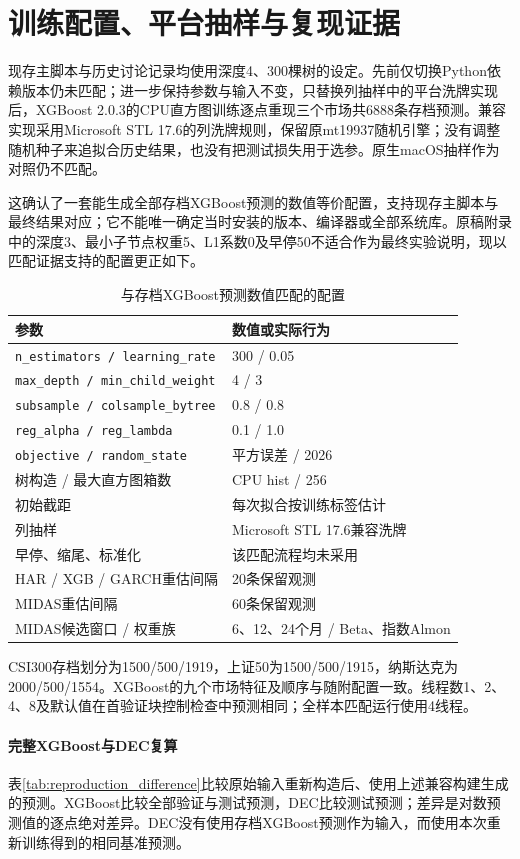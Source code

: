 \appendix
\section{训练配置、平台抽样与复现证据}
现存主脚本与历史讨论记录均使用深度4、300棵树的设定。先前仅切换Python依赖版本仍未匹配；进一步保持参数与输入不变，只替换列抽样中的平台洗牌实现后，XGBoost 2.0.3的CPU直方图训练逐点重现三个市场共6888条存档预测。兼容实现采用Microsoft STL 17.6的列洗牌规则，保留原mt19937随机引擎；没有调整随机种子来追拟合历史结果，也没有把测试损失用于选参。原生macOS抽样作为对照仍不匹配。

这确认了一套能生成全部存档XGBoost预测的数值等价配置，支持现存主脚本与最终结果对应；它不能唯一确定当时安装的版本、编译器或全部系统库。原稿附录中的深度3、最小子节点权重5、L1系数0及早停50不适合作为最终实验说明，现以匹配证据支持的配置更正如下。

\begin{table}[htbp]\centering\caption{与存档XGBoost预测数值匹配的配置}
\begin{tabular}{ll}\toprule 参数 & 数值或实际行为\\\midrule
\texttt{n\_estimators / learning\_rate} & 300 / 0.05\\
\texttt{max\_depth / min\_child\_weight} & 4 / 3\\
\texttt{subsample / colsample\_bytree} & 0.8 / 0.8\\
\texttt{reg\_alpha / reg\_lambda} & 0.1 / 1.0\\
\texttt{objective / random\_state} & 平方误差 / 2026\\
树构造 / 最大直方图箱数 & CPU hist / 256\\
初始截距 & 每次拟合按训练标签估计\\
列抽样 & Microsoft STL 17.6兼容洗牌\\
早停、缩尾、标准化 & 该匹配流程均未采用\\
HAR / XGB / GARCH重估间隔 & 20条保留观测\\
MIDAS重估间隔 & 60条保留观测\\
MIDAS候选窗口 / 权重族 & 6、12、24个月 / Beta、指数Almon\\\bottomrule
\end{tabular}\end{table}

CSI300存档划分为1500/500/1919，上证50为1500/500/1915，纳斯达克为2000/500/1554。XGBoost的九个市场特征及顺序与随附配置一致。线程数1、2、4、8及默认值在首验证块控制检查中预测相同；全样本匹配运行使用4线程。

\paragraph{完整XGBoost与DEC复算}
表\ref{tab:reproduction_difference}比较原始输入重新构造后、使用上述兼容构建生成的预测。XGBoost比较全部验证与测试预测，DEC比较测试预测；差异是对数预测值的逐点绝对差异。DEC没有使用存档XGBoost预测作为输入，而使用本次重新训练得到的相同基准预测。

